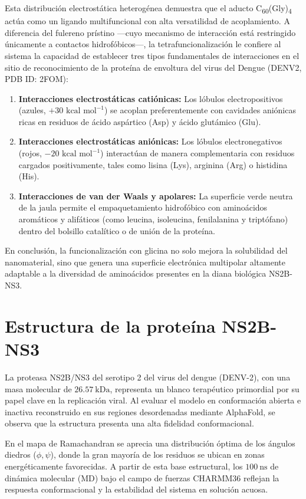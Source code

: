 Esta distribución electrostática heterogénea demuestra que el aducto C\textsubscript{60}(Gly)\textsubscript{4} actúa como un ligando multifuncional con alta versatilidad de acoplamiento. A diferencia del fulereno prístino —cuyo mecanismo de interacción está restringido únicamente a contactos hidrofóbicos—, la tetrafuncionalización le confiere al sistema la capacidad de establecer tres tipos fundamentales de interacciones en el sitio de reconocimiento de la proteína de envoltura del virus del Dengue (DENV2, PDB ID: 2FOM):
\begin{enumerate}
    \item \textbf{Interacciones electrostáticas catiónicas:} Los lóbulos electropositivos (azules, $+30\text{ kcal mol}^{-1}$) se acoplan preferentemente con cavidades aniónicas ricas en residuos de ácido aspártico (Asp) y ácido glutámico (Glu).
    \item \textbf{Interacciones electrostáticas aniónicas:} Los lóbulos electronegativos (rojos, $-20\text{ kcal mol}^{-1}$) interactúan de manera complementaria con residuos cargados positivamente, tales como lisina (Lys), arginina (Arg) o histidina (His).
    \item \textbf{Interacciones de van der Waals y apolares:} La superficie verde neutra de la jaula permite el empaquetamiento hidrofóbico con aminoácidos aromáticos y alifáticos (como leucina, isoleucina, fenilalanina y triptófano) dentro del bolsillo catalítico o de unión de la proteína.
\end{enumerate}

En conclusión, la funcionalización con glicina no solo mejora la solubilidad del nanomaterial, sino que genera una superficie electrónica multipolar altamente adaptable a la diversidad de aminoácidos presentes en la diana biológica NS2B-NS3.       
        
\section{Estructura de la proteína NS2B-NS3}  
La proteasa NS2B/NS3 del serotipo 2 del virus del dengue (DENV-2), con una masa molecular de $26.57\ \text{kDa}$, representa un blanco terapéutico primordial por su papel clave en la replicación viral. Al evaluar el modelo en conformación abierta e inactiva reconstruido en sus regiones desordenadas mediante AlphaFold, se observa que la estructura presenta una alta fidelidad conformacional.

En el mapa de Ramachandran se aprecia una distribución óptima de los ángulos diedros ($\phi, \psi$), donde la gran mayoría de los residuos se ubican en zonas energéticamente favorecidas. A partir de esta base estructural, los $100\ \text{ns}$ de dinámica molecular (MD) bajo el campo de fuerzas CHARMM36 reflejan la respuesta conformacional y la estabilidad del sistema en solución acuosa.



